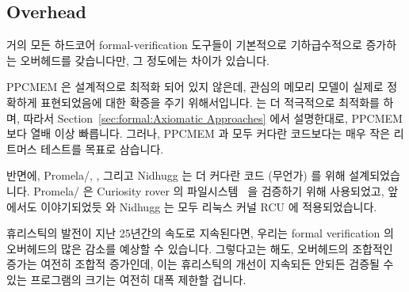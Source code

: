 \subsection{Overhead}
\label{sec:formal:Overhead}

거의 모든 하드코어 formal-verification 도구들이 기본적으로 기하급수적으로
증가하는 오버헤드를 갖습니다만, 그 정도에는 차이가 있습니다.

PPCMEM 은 설계적으로 최적화 되어 있지 않은데, 관심의 메모리 모델이 실제로
정확하게 표현되었음에 대한 확증을 주기 위해서입니다.
 는 더 적극적으로 최적화를 하며, 따라서
Section~\ref{sec:formal:Axiomatic Approaches} 에서 설명한대로, PPCMEM 보다 열배
이상 빠릅니다.
그러나, PPCMEM 과  모두 커다란 코드보다는 매우 작은 리트머스 테스트를
목표로 삼습니다.
\iffalse

Almost all hard-core formal-verification tools are exponential
in nature, however, there are differences in degree.

PPCMEM by design is unoptimized, in order to provide greater assurance
that the memory models of interest are in fact accurately represented.
The \co{herd} tool optimizes more aggressively, and so as described in
Section~\ref{sec:formal:Axiomatic Approaches}, is orders of magnitude
faster than PPCMEM.
Nevertheless, both PPCMEM and \co{herd} target very small litmus tests
rather than larger bodies of code.
\fi

반면에, Promela/, , 그리고 Nidhugg 는 더 커다란 코드 (무언가)
를 위해 설계되었습니다.
Promela/ 은 Curiosity rover 의
파일시스템~\cite{DBLP:journals/amai/GroceHHJX14} 을 검증하기 위해 사용되었고,
앞에서도 이야기되었듯  와 Nidhugg 는 모두 리눅스 커널 RCU 에
적용되었습니다.

휴리스틱의 발전이 지난 25년간의 속도로 지속된다면, 우리는 formal verification
의 오버헤드의 많은 감소를 예상할 수 있습니다.
그렇다고는 해도, 오버헤드의 조합적인 증가는 여전히 조합적 증가인데, 이는
휴리스틱의 개선이 지속되든 안되든 검증될 수 있는 프로그램의 크기는 여전히 대폭
제한할 겁니다.
\iffalse

In contrast, Promela/\co{spin}, \co{cbmc}, and Nidhugg are designed for
(somewhat) larger bodies of code.
Promela/\co{spin} was used to verify the Curiosity rover's
filesystem~\cite{DBLP:journals/amai/GroceHHJX14} and, as noted earlier,
both \co{cbmc} and Nidhugg were appled to Linux-kernel RCU.

If advances in heuristics continue at the rate of the past quarter
century, we can look forward to large reductions in overhead for
formal verification.
That said, combinatorial explosion is still combinatorial explosion,
which would be expected to sharply limit the size of programs that
could be verified, with or without continued improvements in
heuristics.
\fi

